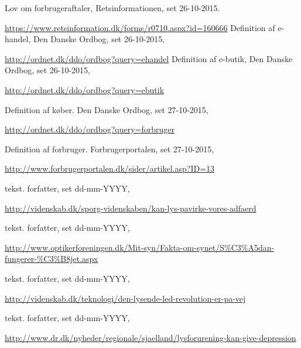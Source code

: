   Lov om forbrugeraftaler,
  Retsinformationen,
  set 26-10-2015.
  
  \url{https://www.retsinformation.dk/forms/r0710.aspx?id=160666}
  Definition af e-handel,
  Den Danske Ordbog,
  set 26-10-2015,
  
  \url{http://ordnet.dk/ddo/ordbog?query=ehandel}
  Definition af e-butik,
  Den Danske Ordbog,
  set 26-10-2015,
  
  \url{http://ordnet.dk/ddo/ordbog?query=ebutik}

  Definition af køber.
  Den Danske Ordbog,
  set 27-10-2015,
  
  \url{http://ordnet.dk/ddo/ordbog?query=forbruger}

  Definition af forbruger.
  Forbrugerportalen,
  set 27-10-2015,
  
  \url{http://www.forbrugerportalen.dk/sider/artikel.asp?ID=13}


  tekst.
  forfatter,
  set dd-mm-YYYY,
  
  \url{http://videnskab.dk/sporg-videnskaben/kan-lys-pavirke-vores-adfaerd}

  tekst.
  forfatter,
  set dd-mm-YYYY,
  
  \url{http://www.optikerforeningen.dk/Mit-syn/Fakta-om-synet/S%C3%A5dan-fungerer-%C3%B8jet.aspx}

  tekst.
  forfatter,
  set dd-mm-YYYY,
  
  \url{http://videnskab.dk/teknologi/den-lysende-led-revolution-er-pa-vej}

  tekst.
  forfatter,
  set dd-mm-YYYY,
  
  \url{http://www.dr.dk/nyheder/regionale/sjaelland/lysforurening-kan-give-depression}